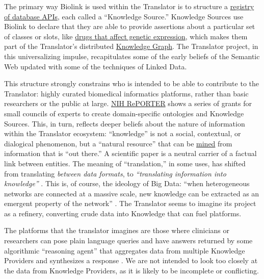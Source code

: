 \documentclass{article}
\begin{document}
The primary way Biolink is used within the Translator is to structure a
\href{http://www.smart-api.info/registry}{registry of database APIs},
each called a ``Knowledge Source.'' Knowledge Sources use Biolink to
declare that they are able to provide assertions about a particular set
of classes or slots, like
\href{http://www.smart-api.info/ui/adf20dd6ff23dfe18e8e012bde686e31}{drugs
that affect genetic expression}, which makes them part of the
Translator's distributed
\href{http://www.smart-api.info/portal/translator/metakg}{Knowledge
Graph}. The Translator project, in this universalizing impulse,
recapitulates some of the early beliefs of the Semantic Web updated with
some of the techniques of Linked Data.

This structure strongly constrains who is intended to be able to
contribute to the Translator: highly curated biomedical informatics
platforms, rather than basic researchers or the public at large.
\href{https://reporter.nih.gov/search/DShVUhB_ZUq0X5UWFjy5WQ/projects?shared=true}{NIH
RePORTER} shows a series of grants for small councils of experts to
create domain-specific ontologies and Knowledge Sources. This, in turn,
reflects deeper beliefs about the nature of information within the
Translator ecosystem: ``knowledge'' is not a social, contextual, or
dialogical phenomenon, but a ``natural resource'' that can be
\href{https://reporter.nih.gov/project-details/10548337}{mined} from
information that is ``out there.'' A scientific paper is a neutral
carrier of a factual link between entities. The meaning of
``translation,'' in some uses, has shifted from translating
\emph{between data formats}, to \emph{``translating information into
knowledge''} \cite{consortiumUniversalBiomedicalData2019} . This
is, of course, the ideology of Big Data: ``when heterogeneous networks
are connected at a massive scale, new knowledge can be extracted as an
emergent property of the network'' \cite{morrisScalablePrecisionMedicine2023} . The Translator seems to
imagine its project as a refinery, converting crude data into Knowledge
that can fuel platforms.

The platforms that the translator imagines are those where clinicians or
researchers can pose plain language queries and have answers returned by
some algorithmic ``reasoning agent'' that aggregates data from multiple
Knowledge Providers and synthesizes a response \cite{unniBiolinkModelUniversal2022, renaissancecomputinginstituterenciBiomedicalDataTranslator2022, renaissancecomputinginstituterenciUseCasesShow2022, goelExplanationContainerCaseBased2021, hailuNIHfundedProjectAims2019} . We are not intended to look too closely at the data from Knowledge
Providers, as it is likely to be incomplete or conflicting.
\end{document}
